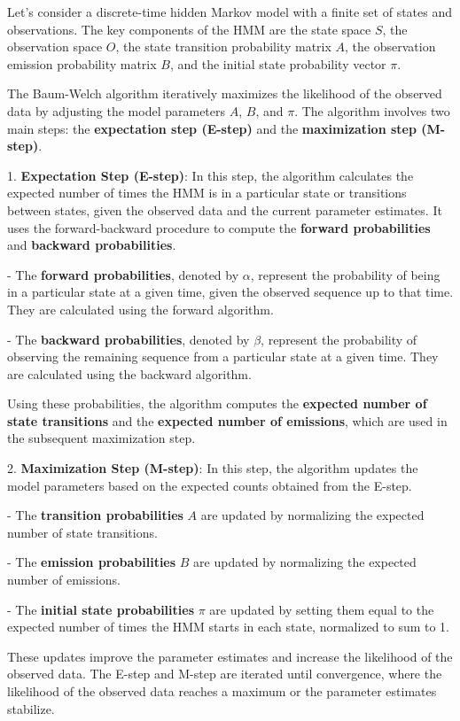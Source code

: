 \documentclass[a4paper,11pt]{article}
\begin{document}
Let's consider a discrete-time hidden Markov model with a finite set of states and observations. The key 
components of the HMM are the state space $S$, the observation space $O$, the state transition probability 
matrix $A$, the observation emission probability matrix $B$, and the initial state probability vector 
$\pi$.

The Baum-Welch algorithm iteratively maximizes the likelihood of the observed data by adjusting the model 
parameters $A$, $B$, and $\pi$. The algorithm involves two main steps: the \textbf{expectation step (E-step)} 
and the \textbf{maximization step (M-step)}.

1. \textbf{Expectation Step (E-step)}: In this step, the algorithm calculates the expected number of times 
the HMM is in a particular state or transitions between states, given the observed data and the current parameter 
estimates. It uses the forward-backward procedure to compute the \textbf{forward probabilities} and 
\textbf{backward probabilities}.

   - The \textbf{forward probabilities}, denoted by $\alpha$, represent the probability of being in a particular 
   state at a given time, given the observed sequence up to that time. They are calculated using the forward 
   algorithm.

   - The \textbf{backward probabilities}, denoted by $\beta$, represent the probability of observing the 
   remaining sequence from a particular state at a given time. They are calculated using the backward 
   algorithm.

   Using these probabilities, the algorithm computes the \textbf{expected number of state transitions} and the 
   \textbf{expected number of emissions}, which are used in the subsequent maximization step.

2. \textbf{Maximization Step (M-step)}: In this step, the algorithm updates the model parameters based on the expected counts obtained from the E-step.

   - The \textbf{transition probabilities} $A$ are updated by normalizing the expected number of state transitions.

   - The \textbf{emission probabilities} $B$ are updated by normalizing the expected number of emissions.

   - The \textbf{initial state probabilities} $\pi$ are updated by setting them equal to the expected number of times the HMM starts in each state, normalized to sum to 1.

   These updates improve the parameter estimates and increase the likelihood of the observed data. The E-step and M-step are iterated until convergence, where the likelihood of the observed data reaches a maximum or the parameter estimates stabilize.
\end{document}
